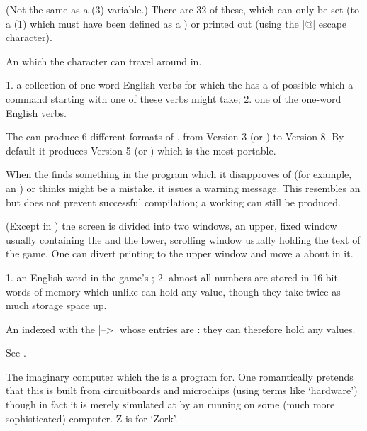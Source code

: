 %
(Not the same as a  (3) variable.)  There are 32 of these, which
can only be set (to a  (1) which must have been defined as a
) or printed out (using the |@| escape character).

%
An  which the  character can travel around in.

%
1. a collection of  one-word English verbs for which the
 has a  of possible  which a command starting
with one of these verbs might take; 2. one of the one-word English verbs.

%
The  can produce 6 different formats of , from
Version 3 (or ) to Version 8.  By default it produces Version 5
(or ) which is the most portable.

%
When the  finds something in the program which it disapproves
of (for example, an ) or thinks might be a mistake, it
issues a warning message.  This resembles an  but does not prevent
successful compilation; a working  can still be produced.

%
(Except in ) the screen is divided into two windows, an
upper, fixed window usually containing the  and the lower,
scrolling window usually holding the text of the game.  One can divert
printing to the upper window and move a  about in it.

%
1. an English word in the game's ; 2. almost all numbers are
stored in 16-bit words of memory which unlike  can hold any
 value, though they take twice as much storage space up.

%
An  indexed with the |-->|  whose entries are
: they can therefore hold any  values.

%
See .

%
The imaginary computer which the  is a program for.  One
romantically pretends that this is built from circuitboards and microchips
(using terms like `hardware') though in fact it is merely simulated at
 by an  running on some (much more sophisticated)
computer.  Z is for `Zork'.
\tenpoint


\vfill\eject\lexiconfalse{}

\immediate\closeout\ans

